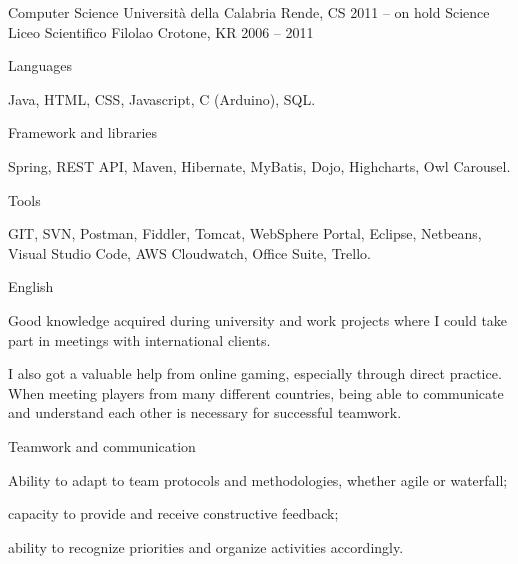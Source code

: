\documentclass[]{style}
\begin{document}
\begin{cventries}
	\cventry
	{Computer Science}
	{Università della Calabria}
	{Rende, CS}
	{2011 – on hold}
	{}
	\cventry
	{Science}
	{Liceo Scientifico Filolao}
	{Crotone, KR}
	{2006 – 2011}
	{}
\end{cventries}

\begin{cventries}
	\cvskillentry
	{Languages}
	{\begin{cventryparagraph}
		\item {Java, HTML, CSS, Javascript, C (Arduino), SQL.}
	\end{cventryparagraph}}
	
	\cvskillentry
	{Framework and libraries}
	{\begin{cventryparagraph}
		\item {Spring, REST API, Maven, Hibernate, MyBatis, Dojo, Highcharts, Owl Carousel.}
	\end{cventryparagraph}}
	
	\cvskillentry
	{Tools}
	{\begin{cventryparagraph}
		\item {GIT, SVN, Postman, Fiddler, Tomcat, WebSphere Portal, Eclipse, Netbeans, Visual Studio Code, AWS Cloudwatch, Office Suite, Trello.}
	\end{cventryparagraph}}
	
	\cvskillentry
	{English}
	{\begin{cventryparagraph}
		\item {Good knowledge acquired during university and work projects where I could take part in meetings with international clients.}
		\item {I also got a valuable help from online gaming, especially through direct practice. When meeting players from many different countries, being able to communicate and understand each other is necessary for successful teamwork.}
	\end{cventryparagraph}}
	
	\cvskillentry
	{Teamwork and communication}
	{\begin{cventryparagraph}
		\item {Ability to adapt to team protocols and methodologies, whether agile or waterfall;}
		\item {capacity to provide and receive constructive feedback;}
		\item {ability to recognize priorities and organize activities accordingly.}
	\end{cventryparagraph}}
\end{cventries}
\end{document}
